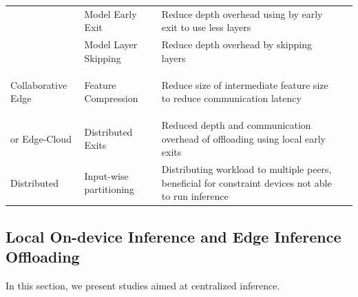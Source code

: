 \begin{minipage}[t]{\linewidth}
\begin{footnotesize}
\begin{longtabu}{>{\bfseries}X[c]|X[l]|X[3l]|X[c]}
			& Model Early Exit & Reduce depth overhead using by early exit to use less layers%
			& \cite{leroux_resource-constrained_2015,teerapittayanon_branchynet:_2016, berestizshevsky_sacrificing_2019, kaya_shallow-deep_nodate, huang_multi-scale_2017} \tabularnewline
			& Model Layer Skipping & Reduce depth overhead by skipping layers %
			& \cite{wang_skipnet:_2017,wu_blockdrop:_2017} \tabularnewline\hline
			
			Collaborative Edge  & Feature Compression & Reduce size of intermediate feature size to reduce communication latency%
			& \cite{kang_neurosurgeon:_2017,choi_near-lossless_2018, choi_deep_2018, eshratifar_bottlenet:_2019} \tabularnewline
			
			or Edge-Cloud & Distributed Exits & Reduced depth and communication overhead of offloading using local early exits%
			& \cite{leroux_cascading_2017,teerapittayanon_distributed_2017, li_edge_2018} \tabularnewline\hline
			
			Distributed & Input-wise partitioning & Distributing workload to multiple peers, beneficial for constraint devices not able to run inference%
			& \cite{mao_modnn:_2017, zhao_deepthings:_2018}
			\tabularnewline
			
			\bottomrule
		\end{longtabu}
	\end{footnotesize}
\end{minipage}

\subsection{Local On-device Inference and Edge Inference Offloading}

In this section, we present studies aimed at centralized inference.

